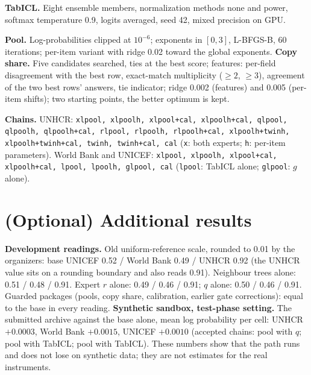 \documentclass{article}
\begin{document}
\textbf{TabICL.} Eight ensemble members, normalization methods none and power, softmax
temperature 0.9, logits averaged, seed 42, mixed precision on GPU.

\textbf{Pool.} Log-probabilities clipped at $10^{-6}$; exponents in $[0,3]$, L-BFGS-B, 60
iterations; per-item variant with ridge 0.02 toward the global exponents.
\textbf{Copy share.} Five candidates searched, ties at the best score; features: per-field
disagreement with the best row, exact-match multiplicity ($\ge 2$, $\ge 3$), agreement of
the two best rows' answers, tie indicator; ridge 0.002 (features) and 0.005 (per-item
shifts); two starting points, the better optimum is kept.

\textbf{Chains.} UNHCR: \texttt{xlpool, xlpoolh, xlpool+cal, xlpoolh+cal, qlpool, qlpoolh,
qlpoolh+cal, rlpool, rlpoolh, rlpoolh+cal, xlpoolh+twinh, xlpoolh+twinh+cal, twinh,
twinh+cal, cal} (\texttt{x}: both experts; \texttt{h}: per-item parameters). World Bank and
UNICEF: \texttt{xlpool, xlpoolh, xlpool+cal, xlpoolh+cal, lpool, lpoolh, glpool, cal}
(\texttt{lpool}: TabICL alone; \texttt{glpool}: $g$ alone).

\section{(Optional) Additional results}
\textbf{Development readings.} Old uniform-reference scale, rounded to 0.01 by the
organizers: base UNICEF 0.52 / World Bank 0.49 / UNHCR 0.92 (the UNHCR value sits on a
rounding boundary and also reads 0.91). Neighbour trees alone: 0.51 / 0.48 / 0.91. Expert
$r$ alone: 0.49 / 0.46 / 0.91; $q$ alone: 0.50 / 0.46 / 0.91. Guarded packages (pools,
copy share, calibration, earlier gate corrections): equal to the base in every reading.
\textbf{Synthetic sandbox, test-phase setting.} The submitted archive against the base alone,
mean log probability per cell: UNHCR $+0.0003$, World Bank $+0.0015$, UNICEF $+0.0010$
(accepted chains: pool with $q$; pool with TabICL; pool with TabICL). These numbers show
that the path runs and does not lose on synthetic data; they are not estimates for the real
instruments.
\end{document}
